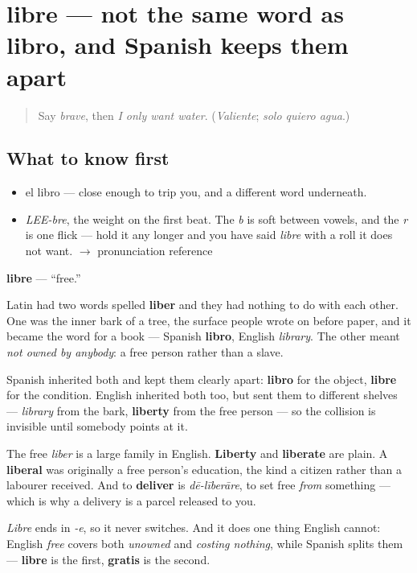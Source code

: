 \section[libre]{libre — not the same word as libro, and Spanish keeps them apart}

\label{lesson:ES-C326-libre}



\begin{quote}
Say \emph{brave}, then \emph{I only want water}. (\emph{Valiente}; \emph{solo quiero agua}.)
\end{quote}

\subsection*{What to know first}
\begin{itemize}
\raggedright
  \item el libro — close enough to trip you, and a different word underneath.
\end{itemize}

\begin{sounds}
\begin{itemize}
\raggedright
  \item \emph{LEE-bre}, the weight on the first beat. The \emph{b} is soft between vowels, and the \emph{r} is one flick — hold it any longer and you have said \emph{libre} with a roll it does not want. $\to$ pronunciation reference
\end{itemize}
\end{sounds}

\begin{cousinweb}
\textbf{libre} — \textquotedblleft{}free.\textquotedblright{}

Latin had two words spelled \textbf{liber} and they had nothing to do with each other. One was the inner bark of a tree, the surface people wrote on before paper, and it became the word for a book — Spanish \textbf{libro}, English \emph{library}. The other meant \emph{not owned by anybody}: a free person rather than a slave.

Spanish inherited both and kept them clearly apart: \textbf{libro} for the object, \textbf{libre} for the condition. English inherited both too, but sent them to different shelves — \emph{library} from the bark, \textbf{liberty} from the free person — so the collision is invisible until somebody points at it.

The free \emph{liber} is a large family in English. \textbf{Liberty} and \textbf{liberate} are plain. A \textbf{liberal} was originally a free person's education, the kind a citizen rather than a labourer received. And to \textbf{deliver} is \emph{dē-līberāre}, to set free \emph{from} something — which is why a delivery is a parcel released to you.

\emph{Libre} ends in \emph{-e}, so it never switches. And it does one thing English cannot: English \emph{free} covers both \emph{unowned} and \emph{costing nothing}, while Spanish splits them — \textbf{libre} is the first, \textbf{gratis} is the second.
\end{cousinweb}

